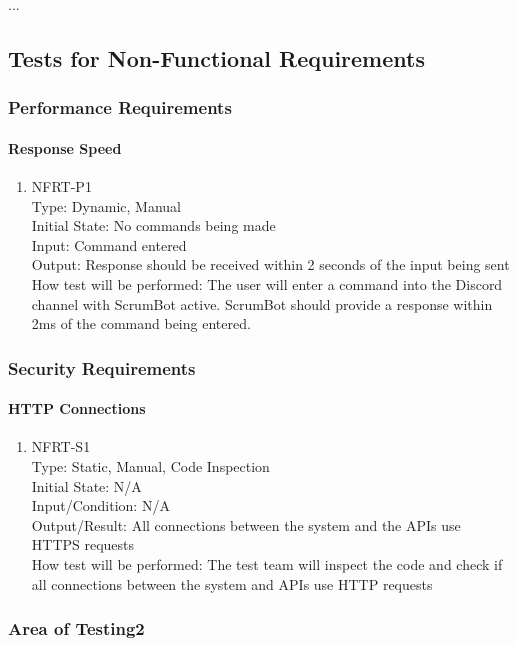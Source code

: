 \documentclass[12pt, titlepage]{article}
\begin{document}
...

\subsection{Tests for Non-Functional Requirements}

\subsubsection{Performance Requirements}
\paragraph{Response Speed}
\begin{enumerate}
\item{NFRT-P1}\\
Type: Dynamic, Manual\\
Initial State: No commands being made\\
Input: Command entered\\
Output: Response should be received within 2 seconds of the input being sent
How test will be performed: The user will enter a command into the Discord channel with ScrumBot active. ScrumBot should provide a response within 2ms of the command being entered.
\end{enumerate}

\subsubsection{Security Requirements}
\paragraph{HTTP Connections}
\begin{enumerate}

\item{NFRT-S1}\\
Type: Static, Manual, Code Inspection\\
Initial State: N/A\\
Input/Condition: N/A\\
Output/Result: All connections between the system and the APIs use HTTPS requests\\
How test will be performed: The test team will inspect the code and check if all connections between the system and APIs use HTTP requests
\end{enumerate}

\subsubsection{Area of Testing2}
\end{document}
